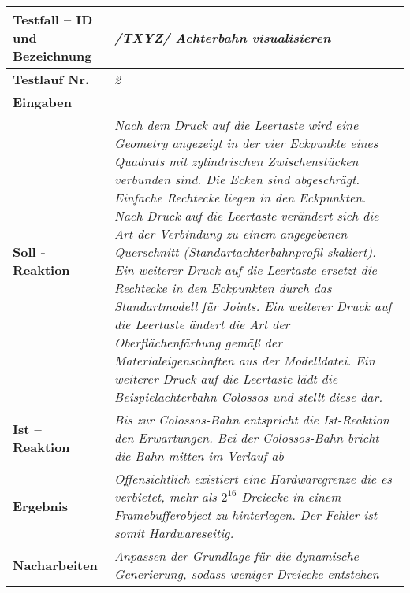 \begin{longtable}{|p{7cm}|p{10cm}|}
\hline
\textbf{Testfall -- ID und Bezeichnung} & \textit{ /TXYZ/ Achterbahn visualisieren} \\
\hline
\textbf{Testlauf Nr.} & \textit{2} \\
\hline
\textbf{Eingaben} & \textit{} \\
\hline
\textbf{Soll - Reaktion} & \textit{Nach dem Druck auf die Leertaste wird eine Geometry angezeigt in der vier Eckpunkte eines Quadrats mit zylindrischen Zwischenstücken verbunden sind. Die Ecken sind abgeschrägt. Einfache Rechtecke liegen in den Eckpunkten.
Nach Druck auf die Leertaste verändert sich die Art der Verbindung zu einem angegebenen Querschnitt (Standartachterbahnprofil skaliert). Ein weiterer Druck auf die Leertaste ersetzt die Rechtecke in den Eckpunkten durch 
das Standartmodell für Joints. Ein weiterer Druck auf die Leertaste ändert die Art der Oberflächenfärbung gemäß der Materialeigenschaften aus der Modelldatei. Ein weiterer Druck auf die Leertaste lädt die Beispielachterbahn Colossos und stellt diese dar.
} \\
\hline
\textbf{Ist -- Reaktion} & \textit{Bis zur Colossos-Bahn entspricht die Ist-Reaktion den Erwartungen. Bei der Colossos-Bahn bricht die Bahn mitten im Verlauf ab} \\
\hline
\textbf{Ergebnis} & \textit{Offensichtlich existiert eine Hardwaregrenze die es verbietet, mehr als $2^{16}$ Dreiecke in einem Framebufferobject zu hinterlegen. Der Fehler ist somit Hardwareseitig.} \\
\hline
\textbf{Nacharbeiten } & \textit{Anpassen der Grundlage für die dynamische Generierung, sodass weniger Dreiecke entstehen} \\
\hline
 \end{longtable}

